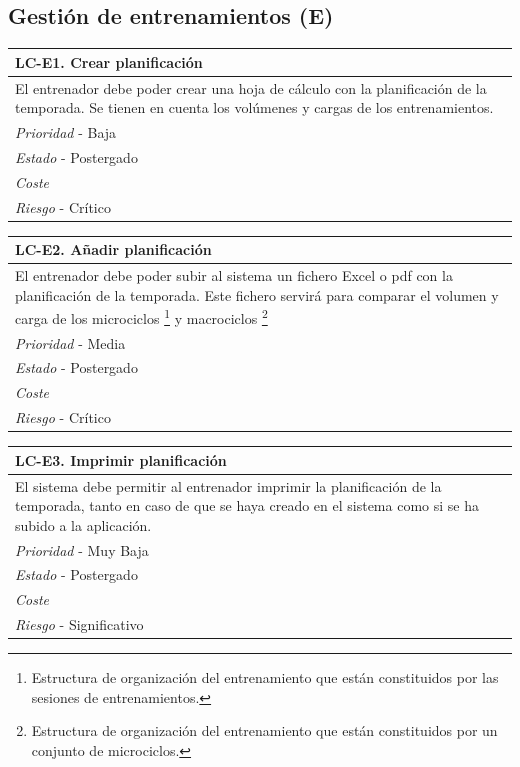 
%
%
\subsection{Gestión de entrenamientos (E)} %
	\label{sub:gestion_de_entrenamientos}

	\begin{center}
		\begin{tabularx}{15cm}{|X|}
			\hline 
				\bf{LC-E1. Crear planificación}\\
			\hline
				El entrenador debe poder crear una hoja de cálculo con la planificación de la temporada. Se tienen en cuenta los volúmenes y cargas de los entrenamientos.\\
			\hline
				{\it Prioridad} - Baja\\
			\hline
				{\it Estado} - Postergado\\
			\hline
				{\it Coste}\\
			\hline
				{\it Riesgo} - Crítico\\
			\hline
		\end{tabularx}
	\end{center}
	
	\begin{center}
		\begin{tabularx}{15cm}{|X|}
			\hline 
				\bf{LC-E2. Añadir planificación}\\
			\hline
				El entrenador debe poder subir al sistema un fichero Excel o pdf con la planificación de la temporada. Este fichero servirá para comparar el volumen y carga de los microciclos \footnote{Estructura de organización del entrenamiento que están constituidos por las sesiones de entrenamientos.} y macrociclos \footnote{Estructura de organización del entrenamiento que están constituidos por un conjunto de microciclos.}\\
			\hline
				{\it Prioridad} - Media\\
			\hline
				{\it Estado} - Postergado\\
			\hline
				{\it Coste}\\
			\hline
				{\it Riesgo} - Crítico\\
			\hline
		\end{tabularx}
	\end{center}
	
	\begin{center}
		\begin{tabularx}{15cm}{|X|}
			\hline 
				\bf{LC-E3. Imprimir planificación}\\
			\hline
				El sistema debe permitir al entrenador imprimir la planificación de la temporada, tanto en caso de que se haya creado en el sistema como si se ha subido a la aplicación.\\
			\hline
				{\it Prioridad} - Muy Baja\\
			\hline
				{\it Estado} - Postergado\\
			\hline
				{\it Coste}\\
			\hline
				{\it Riesgo} - Significativo\\
			\hline
		\end{tabularx}
	\end{center}
	

